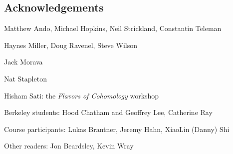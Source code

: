 


\newpage

\subsection*{Acknowledgements}

Matthew Ando, Michael Hopkins, Neil Strickland, Constantin Teleman

Haynes Miller, Doug Ravenel, Steve Wilson

Jack Morava

Nat Stapleton



Hisham Sati: the \textit{Flavors of Cohomology} workshop

Berkeley students: Hood Chatham and Geoffrey Lee, Catherine Ray

Course participants: Lukas Brantner, Jeremy Hahn, XiaoLin (Danny) Shi

Other readers: Jon Beardsley, Kevin Wray
